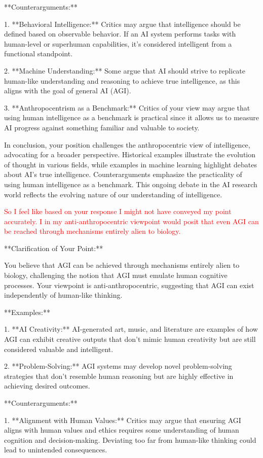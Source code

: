 \documentclass{article}
\begin{document}
**Counterarguments:**

1. **Behavioral Intelligence:** Critics may argue that intelligence should be defined based on observable behavior. If an AI system performs tasks with human-level or superhuman capabilities, it's considered intelligent from a functional standpoint.

2. **Machine Understanding:** Some argue that AI should strive to replicate human-like understanding and reasoning to achieve true intelligence, as this aligns with the goal of general AI (AGI).

3. **Anthropocentrism as a Benchmark:** Critics of your view may argue that using human intelligence as a benchmark is practical since it allows us to measure AI progress against something familiar and valuable to society.

In conclusion, your position challenges the anthropocentric view of intelligence, advocating for a broader perspective. Historical examples illustrate the evolution of thought in various fields, while examples in machine learning highlight debates about AI's true intelligence. Counterarguments emphasize the practicality of using human intelligence as a benchmark. This ongoing debate in the AI research world reflects the evolving nature of our understanding of intelligence.

\textcolor{red}{So I feel like based on your response I might not have conveyed my point accurately. I in my anti-anthropocentric viewpoint would posit that even AGI can be reached through mechanisms entirely alien to biology.}

**Clarification of Your Point:**

You believe that AGI can be achieved through mechanisms entirely alien to biology, challenging the notion that AGI must emulate human cognitive processes. Your viewpoint is anti-anthropocentric, suggesting that AGI can exist independently of human-like thinking.

**Examples:**

1. **AI Creativity:** AI-generated art, music, and literature are examples of how AGI can exhibit creative outputs that don't mimic human creativity but are still considered valuable and intelligent.

2. **Problem-Solving:** AGI systems may develop novel problem-solving strategies that don't resemble human reasoning but are highly effective in achieving desired outcomes.

**Counterarguments:**

1. **Alignment with Human Values:** Critics may argue that ensuring AGI aligns with human values and ethics requires some understanding of human cognition and decision-making. Deviating too far from human-like thinking could lead to unintended consequences.
\end{document}
